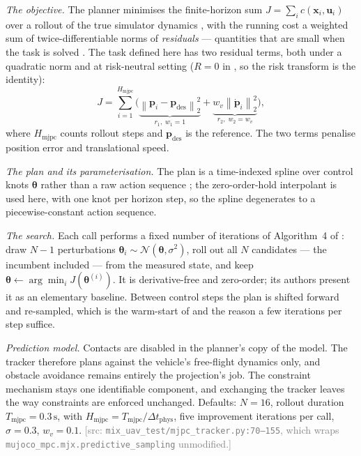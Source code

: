 \documentclass[headsepline,footsepline,footinclude=false,oneside,fontsize=11pt,paper=a4,listof=totoc,bibliography=totoc]{scrbook}
\theoremstyle{definition}
\theoremstyle{plain}
\theoremstyle{remark}
\newcommand{\vect}[1]{\boldsymbol{#1}}
\newcommand{\sidx}[1]{_{\textrm{#1}}}
\newcommand{\Normal}{\mathcal{N}}              %
\newif\ifsubmission
\newcommand{\srcnote}[1]{\ifsubmission\else\textcolor{gray}{\footnotesize\textsf{[src: #1]}}\fi}
\begin{document}
\emph{The objective.} The planner minimises the finite-horizon sum
$J = \sum_{i} c(\vect{x}_{i},\vect{u}_{i})$ over a rollout of the true simulator dynamics
\parencite[Eq.~(3)]{howell2022predictive}, with the running cost a weighted sum of twice-differentiable
norms of \emph{residuals} --- quantities that are small when the task is solved
\parencite[Eq.~(4)]{howell2022predictive}. The task defined here has two residual terms, both under a
quadratic norm and at risk-neutral setting ($R = 0$ in
\parencite[Eq.~(5)]{howell2022predictive}, so the risk transform is the identity):
\begin{equation}\label{eq:method:dep:mjpc}
  J = \sum_{i=1}^{H\sidx{mjpc}}
      \Big(\underbrace{\left\|\vect{p}_{i}-\vect{p}\sidx{des}\right\|_{2}^{2}}_{r_{1},\;w_{1}=1}
      + \underbrace{w_{v}\left\|\dot{\vect{p}}_{i}\right\|_{2}^{2}}_{r_{2},\;w_{2}=w_{v}}\Big),
\end{equation}
where $H\sidx{mjpc}$ counts rollout steps and $\vect{p}\sidx{des}$ is the reference.
The two terms penalise position error and translational speed.

\emph{The plan and its parameterisation.} The plan is a time-indexed spline over control knots
$\vect{\theta}$ rather than a raw action sequence \parencite[\S3.3]{howell2022predictive}; the
zero-order-hold interpolant is used here, with one knot per horizon step, so the spline degenerates
to a piecewise-constant action sequence.

\emph{The search.} Each call performs a fixed number of iterations of Algorithm~4 of
\parencite{howell2022predictive}: draw $N-1$ perturbations
$\vect{\theta}_{i} \sim \Normal(\vect{\theta},\sigma^{2})$, roll out all $N$ candidates --- the
incumbent included --- from the measured state, and keep
$\vect{\theta} \leftarrow \arg\min_{i} J(\vect{\theta}^{(i)})$. It is derivative-free and zero-order;
its authors present it as an elementary baseline. Between control steps the plan is shifted forward
and re-sampled, which is the warm-start of
\parencite[Alg.~1]{howell2022predictive} and the reason a few iterations per step suffice.

\emph{Prediction model.} Contacts are disabled in the planner's copy of the model. The
tracker therefore plans against the vehicle's free-flight dynamics only, and obstacle avoidance
remains entirely the projection's job. The constraint mechanism stays one identifiable component,
and exchanging the tracker leaves the way constraints are enforced unchanged.
Defaults: $N = 16$, rollout duration $T\sidx{mjpc} = 0.3\,\textrm{s}$, with
$H\sidx{mjpc}=T\sidx{mjpc}/\Delta t\sidx{phys}$, five improvement iterations
per call, $\sigma = 0.3$, $w_{v} = 0.1$.
\srcnote{\texttt{mix\_uav\_test/mjpc\_tracker.py:70--155}, which wraps
\texttt{mujoco\_mpc.mjx.predictive\_sampling} unmodified.}
\end{document}
